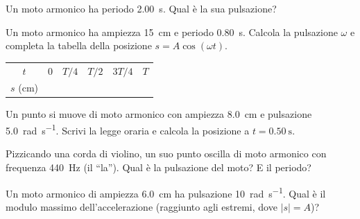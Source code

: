\begin{esercizio}
Un moto armonico ha periodo \SI{2,00}{\second}. Qual è la sua pulsazione?\\
\end{esercizio}

\begin{esercizio}
Un moto armonico ha ampiezza \SI{15}{\centi\metre} e periodo \SI{0,80}{\second}. Calcola la pulsazione $\omega$ e completa la tabella della posizione $s = A\cos(\omega t)$.

\begin{center}
\begin{tabular}{c|ccccc}
    \toprule
    $t$ & $0$ & $T/4$ & $T/2$ & $3T/4$ & $T$ \\[2pt]
    $s$ (cm) & \underline{\hspace{1.1cm}} & \underline{\hspace{1.1cm}} & \underline{\hspace{1.1cm}} & \underline{\hspace{1.1cm}} & \underline{\hspace{1.1cm}} \\
    \bottomrule
\end{tabular}
\end{center}
\end{esercizio}

\begin{esercizio}
Un punto si muove di moto armonico con ampiezza \SI{8,0}{\centi\metre} e pulsazione \SI{5,0}{\radian\per\second}. Scrivi la legge oraria e calcola la posizione a $t = \SI{0,50}{\second}$.\\
\end{esercizio}

\begin{esercizio}
Pizzicando una corda di violino, un suo punto oscilla di moto armonico con frequenza \SI{440}{\hertz} (il ``la''). Qual è la pulsazione del moto? E il periodo?\\
\end{esercizio}

\begin{esercizio}
Un moto armonico di ampiezza \SI{6,0}{\centi\metre} ha pulsazione \SI{10}{\radian\per\second}. Qual è il modulo massimo dell'accelerazione (raggiunto agli estremi, dove $|s| = A$)?\\
\end{esercizio}

